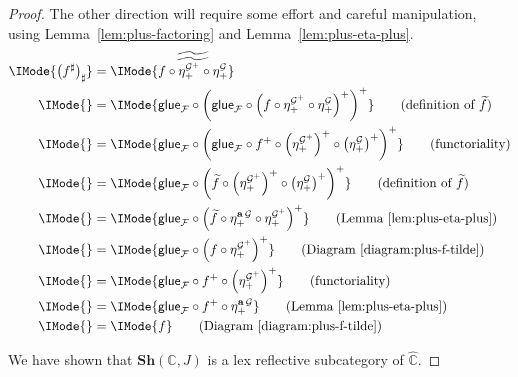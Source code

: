 \documentclass{article}
\newcommand\AIsEq[2]{\IMode{#1} &=\IMode{#2}}
\newcommand\Psh[1]{\widehat{#1}}
\newcommand\Sh[1]{\mathbf{Sh} (#1)}
\DeclareMathOperator{\Sheafify}{{\mathbf{a}}}
\newcommand\Plus[1]{{#1}^+}
\newcommand\Glue[1]{\mathsf{glue}_{#1}}
\begin{document}
\begin{proof}
  The other direction will require some effort and careful
  manipulation, using Lemma~\ref{lem:plus-factoring} and
  Lemma~\ref{lem:plus-eta-plus}.
  \begin{align*}
    \AIsEq{
      {\left(f^\sharp\right)}_\sharp
    }{
      \widetilde{
        \widetilde{
          f\circ\eta_+^{\Plus{\mathcal{G}}}\circ\eta_+^{\mathcal{G}}
        }
      }
    }
    \\
    \AIsEq{
    }{
      \Glue{\mathcal{F}}
      \circ
      \Plus{
        \left(
          \Glue{\mathcal{F}}\circ
          \Plus{
            \left(
               f\circ\eta_+^{\Plus{\mathcal{G}}}\circ\eta_+^{\mathcal{G}}
            \right)
          }
        \right)
      }
    }
    \tag{definition of $\widetilde{f}$}
    \\
    \AIsEq{
    }{
      \Glue{\mathcal{F}}
      \circ
      \Plus{
        \left(
          \Glue{\mathcal{F}}
          \circ
          \Plus{f}
          \circ
          \Plus{\left(\eta_+^{\Plus{\mathcal{G}}}\right)}
          \circ
          \Plus{\left(\eta_+^{\mathcal{G}}\right)}
        \right)
      }
    }
    \tag{functoriality}
    \\
    \AIsEq{
    }{
      \Glue{\mathcal{F}}
      \circ
      \Plus{
        \left(
          \widetilde{f}
          \circ
          \Plus{\left(\eta_+^{\Plus{\mathcal{G}}}\right)}
          \circ
          \Plus{\left(\eta_+^{\mathcal{G}}\right)}
        \right)
      }
    }
    \tag{definition of $\widetilde{f}$}
    \\
    \AIsEq{
    }{
      \Glue{\mathcal{F}}
      \circ
      \Plus{
        \left(
          \widetilde{f}
          \circ
          \eta_+^{\Sheafify\mathcal{G}}
          \circ
          \eta_+^{\Plus{\mathcal{G}}}
        \right)
      }
    }
    \tag{Lemma~\ref{lem:plus-eta-plus}}
    \\
    \AIsEq{
    }{
      \Glue{\mathcal{F}}
      \circ
      \Plus{
        \left(
          f
          \circ
          \eta_+^{\Plus{\mathcal{G}}}
        \right)
      }
    }
    \tag{Diagram~\ref{diagram:plus-f-tilde}}
    \\
    \AIsEq{
    }{
      \Glue{\mathcal{F}}
      \circ
      \Plus{f}
      \circ
      \Plus{
        \left(\eta_+^{\Plus{\mathcal{G}}}\right)
      }
    }
    \tag{functoriality}
    \\
    \AIsEq{
    }{
      \Glue{\mathcal{F}}
      \circ
      \Plus{f}
      \circ
      \eta_+^{\Sheafify\mathcal{G}}
    }
    \tag{Lemma~\ref{lem:plus-eta-plus}}
    \\
    \AIsEq{
    }{
      f
    }
    \tag{Diagram~\ref{diagram:plus-f-tilde}}
  \end{align*}

  We have shown that $\Sh{\mathbb{C},J}$ is a lex reflective
  subcategory of $\Psh{\mathbb{C}}$.

\end{proof}
\end{document}
